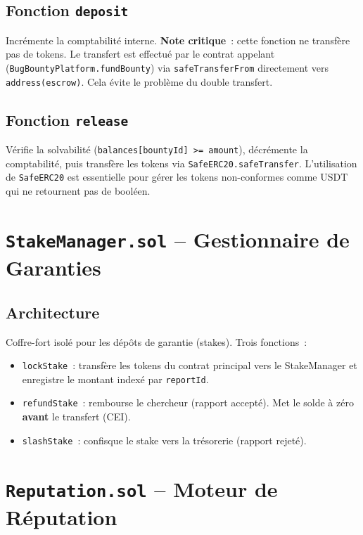 \documentclass[12pt, a4paper]{report}
\begin{document}
\subsection{Fonction \texttt{deposit}}
Incr\'{e}mente la comptabilit\'{e} interne. \textbf{Note critique}~: cette fonction ne transf\`{e}re pas de tokens. Le transfert est effectu\'{e} par le contrat appelant (\texttt{BugBountyPlatform.fundBounty}) via \texttt{safeTransferFrom} directement vers \texttt{address(escrow)}. Cela \'{e}vite le probl\`{e}me du double transfert.

\subsection{Fonction \texttt{release}}
V\'{e}rifie la solvabilit\'{e} (\texttt{balances[bountyId] >= amount}), d\'{e}cr\'{e}mente la comptabilit\'{e}, puis transf\`{e}re les tokens via \texttt{SafeERC20.safeTransfer}. L'utilisation de \texttt{SafeERC20} est essentielle pour g\'{e}rer les tokens non-conformes comme USDT qui ne retournent pas de bool\'{e}en.

\section{\texttt{StakeManager.sol} -- Gestionnaire de Garanties}

\subsection{Architecture}
Coffre-fort isol\'{e} pour les d\'{e}p\^{o}ts de garantie (stakes). Trois fonctions~:
\begin{itemize}
    \item \texttt{lockStake}~: transf\`{e}re les tokens du contrat principal vers le StakeManager et enregistre le montant index\'{e} par \texttt{reportId}.
    \item \texttt{refundStake}~: rembourse le chercheur (rapport accept\'{e}). Met le solde \`{a} z\'{e}ro \textbf{avant} le transfert (CEI).
    \item \texttt{slashStake}~: confisque le stake vers la tr\'{e}sorerie (rapport rejet\'{e}).
\end{itemize}

\section{\texttt{Reputation.sol} -- Moteur de R\'{e}putation}
\end{document}
